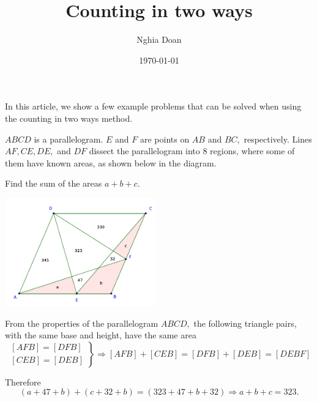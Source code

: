 \documentclass{article}
\title{Counting in two ways}
\author{Nghia Doan}
\date{\today}
\begin{document}
\maketitle

In this article, we show a few example problems that can be solved when using the counting in two ways method.

\begin{example*}

    $ABCD$ is a parallelogram. $E$ and $F$ are points on $AB$ and $BC,$ respectively.
    Lines $AF, CE, DE,$ and $DF$ dissect the parallelogram into $8$ regions,
    where some of them have known areas, as shown below in the diagram.

    Find the sum of the areas $a+b+c.$
\end{example*}

\begin{center}
    \includegraphics[width=6.5cm]{./svg/pdf/hc-2022-2-2-6.pdf}
\end{center}

\begin{soln}
    From the properties of the parallelogram $ABCD,$ the following triangle pairs, with the same base and height, have the same area
    \[
        \left.
            \begin{aligned}
                [AFB] = [DFB]\\
                [CEB] = [DEB]
            \end{aligned}
        \right\}
        \Rightarrow [AFB] + [CEB] = [DFB] + [DEB] = [DEBF]
    \]

    Therefore
    \[
        (a + 47 + b) + (c + 32 + b) = (323 + 47 + b + 32)
        \Rightarrow a + b + c = \boxed{323.}
    \]
\end{soln}
\end{document}
